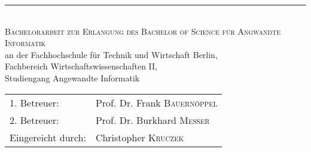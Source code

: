 \begin{titlepage}
	\begin{center} 
		\vspace*{2 cm}
		\textsc{\LARGE \mytitle}
		\rule{\textwidth}{0.4pt} \\[1.5cm]
		\textsc{\Large Bachelorarbeit zur Erlangung des Bachelor of Science f\"ur Angwandte Informatik}\\[1.5cm]
			
			an der Fachhochschule für Technik und Wirtschaft Berlin,\\
Fachbereich Wirtschaftswissenschaften II,\\
Studiengang Angewandte Informatik\\[1cm]			
		\vspace{3cm}
	\end{center}

\begin{center}
\begin{tabular}[h!]{l l}
1. Betreuer: & Prof. Dr. Frank \textsc{Bauern\"oppel}\\
2. Betreuer: & Prof. Dr. Burkhard \textsc{Messer}\\[2cm]
Eingereicht durch: & Christopher \textsc{Kruczek}
\end{tabular}
\end{center}

	\vfill
	\center {\today}
\end{titlepage}
